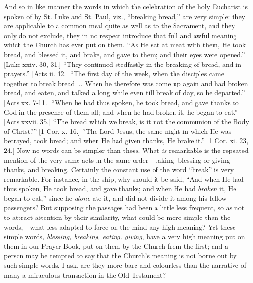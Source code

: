 And so in like manner the words in which the celebration of the
holy Eucharist is spoken of by St. Luke and St. Paul, viz.,
``breaking bread,'' are very simple: they are applicable to a
common meal quite as well as to the Sacrament, and they only do not
exclude, they in no respect introduce that full and awful
meaning which the Church has ever put on them. ``As He sat at meat
with them, He took bread, and blessed it, and brake, and gave to them;
and their eyes were opened.'' [Luke xxiv. 30, 31.] ``They
continued stedfastly in the breaking of bread, and in prayers.''
[Acts ii. 42.] ``The first day of the week, when the disciples
came together to break bread ... When he therefore was come up again
and had broken bread, and eaten, and talked a long while even till
break of day, so he departed.'' [Acts xx. 7-11.] ``When he had
thus spoken, he took bread, and gave thanks to God in the presence of
them all; and when he had broken it, he began to eat.'' [Acts
xxvii. 35.] ``The bread which we break, is it not the communion of
the Body of Christ?'' [1 Cor. x. 16.] ``The Lord Jesus, the
same night in which He was betrayed, took bread; and when He had given
thanks, He brake it.'' [1 Cor. xi. 23, 24.] Now no words can be
simpler than these. What \emph{is} remarkable is the repeated mention
of the very same acts in the same order—taking, blessing or giving
thanks, and breaking. Certainly the constant use of the word
``break'' is very remarkable. For instance, in the ship, why
should it be said, ``And when He had thus spoken, He took bread,
and gave thanks; and when He had \emph{broken} it, He began to
eat,'' since he \emph{alone} ate it, and did not divide it among
his fellow-passengers? But supposing the passages had been a little
less frequent, so as not to attract attention by their similarity,
what could be more simple than the words,—what less adapted to force
on the mind any high meaning? Yet these simple words, \emph{blessing,
breaking, eating, giving}, have a very high meaning put on them in
our Prayer Book, put on them by the Church from the first; and a
person may be tempted to say that the Church's meaning is not
borne out by such simple words. I ask, are they more bare and
colourless than the narrative of many a miraculous transaction in the
Old Testament?


